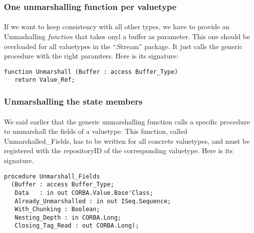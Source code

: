 \subsubsection{One unmarshalling function per valuetype}

\paragraph{}If we want to keep consistency with all other types, we
have to provide an Unmashalling {\em function} that takes onyl a
buffer as parameter. This one should be overloaded for all valuetypes
in the ``.Stream'' package. It just calls the generic procedure with
the right paramters. Here is its signature:

\begin{verbatim}
function Unmarshall (Buffer : access Buffer_Type)
   return Value_Ref;
\end{verbatim}

\subsubsection{Unmarshalling the state members}

\paragraph{}We said earlier that the generic unmarshalling function
   calls a specific procedure to unmarshall the fields of a
   valuetype. This function, called Unmarshalled\_Fields, has to be
   written for all concrete valuetypes, and must be registered with
   the repositoryID of the corresponding valuetype. Here is its
   signature.

\begin{verbatim}
procedure Unmarshall_Fields
  (Buffer : access Buffer_Type;
   Data   : in out CORBA.Value.Base'Class;
   Already_Unmarshalled : in out ISeq.Sequence;
   With_Chunking : Boolean;
   Nesting_Depth : in CORBA.Long;
   Closing_Tag_Read : out CORBA.Long);
\end{verbatim}

